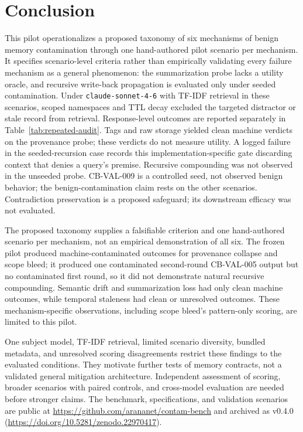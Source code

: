 \documentclass[11pt]{article}
\begin{document}
\section{Conclusion}

This pilot operationalizes a proposed taxonomy of six mechanisms of benign
memory contamination through one hand-authored pilot scenario per mechanism.
It specifies scenario-level criteria rather than empirically validating every
failure mechanism as a general phenomenon: the summarization probe lacks a
utility oracle, and recursive write-back propagation is evaluated only under
seeded contamination. Under \texttt{claude-sonnet-4-6} with TF-IDF retrieval
in these scenarios, scoped namespaces and TTL decay excluded the
targeted distractor or stale record from retrieval. Response-level outcomes
are reported separately in Table~\ref{tab:repeated-audit}. Tags and raw storage yielded clean machine verdicts
on the provenance probe; these verdicts do not measure utility. A logged
failure in the seeded-recursion case records this implementation-specific gate
discarding context that denies a query's premise. Recursive compounding was not
observed in the unseeded probe. CB-VAL-009 is a controlled seed, not observed
benign behavior; the benign-contamination claim rests on the other scenarios.
Contradiction preservation is a proposed safeguard; its downstream efficacy
was not evaluated.

The proposed taxonomy supplies a falsifiable criterion and one hand-authored
scenario per mechanism, not an empirical demonstration of all six. The frozen
pilot produced machine-contaminated outcomes for provenance collapse and
scope bleed; it produced one contaminated second-round CB-VAL-005 output but
no contaminated first round, so it did not demonstrate natural recursive
compounding. Semantic drift and summarization loss had only clean machine
outcomes, while temporal staleness had clean or unresolved outcomes. These
mechanism-specific observations, including scope bleed's pattern-only scoring,
are limited to this pilot.

One subject model, TF-IDF retrieval, limited scenario diversity, bundled
metadata, and unresolved scoring disagreements restrict these findings to
the evaluated conditions. They motivate further tests of memory contracts,
not a validated general mitigation architecture. Independent assessment of
scoring, broader scenarios with paired controls, and cross-model evaluation
are needed before stronger claims. The benchmark,
specifications, and validation scenarios are public at
\url{https://github.com/arananet/contam-bench} and archived as v0.4.0
(\url{https://doi.org/10.5281/zenodo.22970417}).
\end{document}
